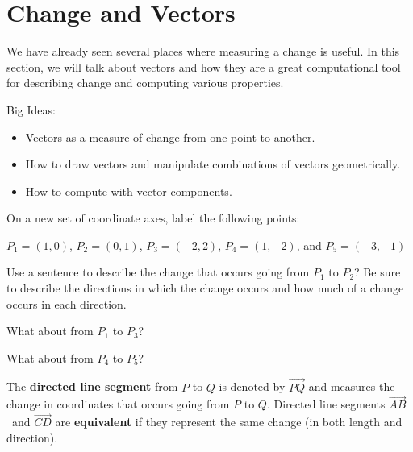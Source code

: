 

\section{Change and Vectors}

We have already seen several places where measuring a change is useful. In this section, we will talk about vectors and how they are a great computational tool for describing change and computing various properties.

Big Ideas:
\begin{itemize}
\item Vectors as a measure of change from one point to another.
\item How to draw vectors and manipulate combinations of vectors geometrically.
\item How to compute with vector components.
\end{itemize}

\bq \be \item On a new set of coordinate axes, label the following points:

$P_1=(1,0)$, $P_2=(0,1)$, $P_3=(-2,2)$, $P_4=(1,-2)$, and  $P_5=(-3,-1)$

\item Use a sentence to describe the change that occurs going from $P_1$ to $P_2$? Be sure to describe the directions in which the change occurs and how much of a change occurs in each direction.
\item What about from $P_1$ to $P_3$?
\item What about from $P_4$ to $P_5$?
\ee \eq

\begin{info} The \textbf{directed line segment} from $P$ to $Q$ is denoted by $\overrightarrow{PQ}$ and measures the change in coordinates that occurs going from $P$ to $Q$. Directed line segments $\overrightarrow{AB}$  and $\overrightarrow{CD}$ are \textbf{equivalent} if they represent the same change (in both length  and direction). \end{info}

